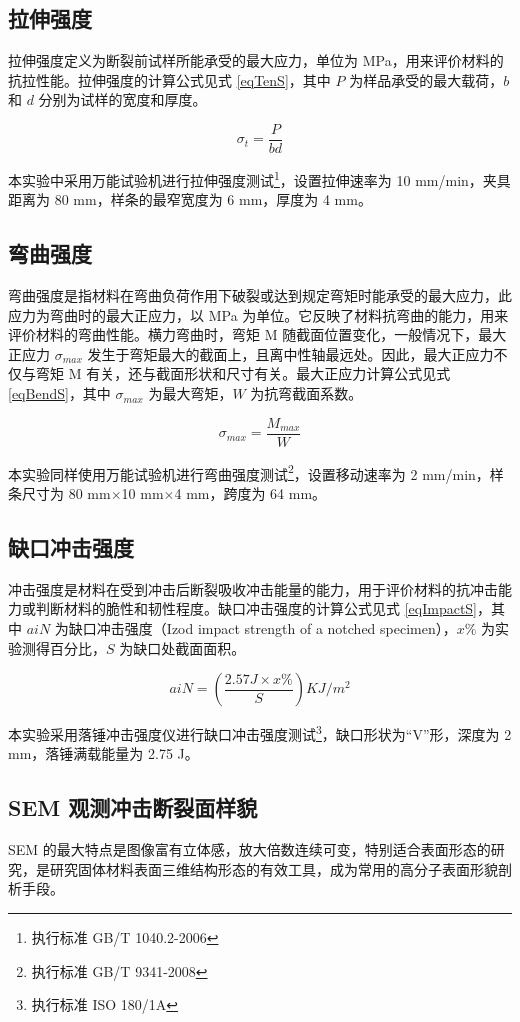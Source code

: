 \subsection{拉伸强度}
拉伸强度定义为断裂前试样所能承受的最大应力，单位为 MPa，用来评价材料的抗拉性能。拉伸强度的计算公式见式 \eqref{eqTenS}，其中 $P$ 为样品承受的最大载荷，$b$ 和 $d$ 分别为试样的宽度和厚度。

\begin{equation}
    \label{eqTenS}
    \sigma_t = \frac{P}{bd}
\end{equation}

本实验中采用万能试验机进行拉伸强度测试\footnote{执行标准 GB/T 1040.2-2006}，设置拉伸速率为 10 mm/min，夹具距离为 80 mm，样条的最窄宽度为 6 mm，厚度为 4 mm。

\subsection{弯曲强度}
弯曲强度是指材料在弯曲负荷作用下破裂或达到规定弯矩时能承受的最大应力，此应力为弯曲时的最大正应力，以 MPa 为单位。它反映了材料抗弯曲的能力，用来评价材料的弯曲性能。横力弯曲时，弯矩 M 随截面位置变化，一般情况下，最大正应力 $\sigma_{max}$ 发生于弯矩最大的截面上，且离中性轴最远处。因此，最大正应力不仅与弯矩 M 有关，还与截面形状和尺寸有关。最大正应力计算公式见式 \eqref{eqBendS}，其中 $\sigma_{max}$ 为最大弯矩，$W$ 为抗弯截面系数。

\begin{equation}
    \label{eqBendS}
    \sigma_{max} = \frac{M_{max}}{W}
\end{equation}

本实验同样使用万能试验机进行弯曲强度测试\footnote{执行标准 GB/T 9341-2008}，设置移动速率为 2 mm/min，样条尺寸为 80 mm$\times$10 mm$\times$4 mm，跨度为 64 mm。

\subsection{缺口冲击强度}
冲击强度是材料在受到冲击后断裂吸收冲击能量的能力，用于评价材料的抗冲击能力或判断材料的脆性和韧性程度。缺口冲击强度的计算公式见式 \eqref{eqImpactS}，其中 $aiN$ 为缺口冲击强度（Izod impact strength of a notched specimen），$x\%$ 为实验测得百分比，$S$ 为缺口处截面面积。

\begin{equation}
    \label{eqImpactS}
    aiN = (\frac{2.57 J \times x\%}{S}) KJ/m^2
\end{equation}

本实验采用落锤冲击强度仪进行缺口冲击强度测试\footnote{执行标准 ISO 180/1A}，缺口形状为“V”形，深度为 2 mm，落锤满载能量为 2.75 J。

\subsection{SEM 观测冲击断裂面样貌}
SEM 的最大特点是图像富有立体感，放大倍数连续可变，特别适合表面形态的研究，是研究固体材料表面三维结构形态的有效工具，成为常用的高分子表面形貌剖析手段。
